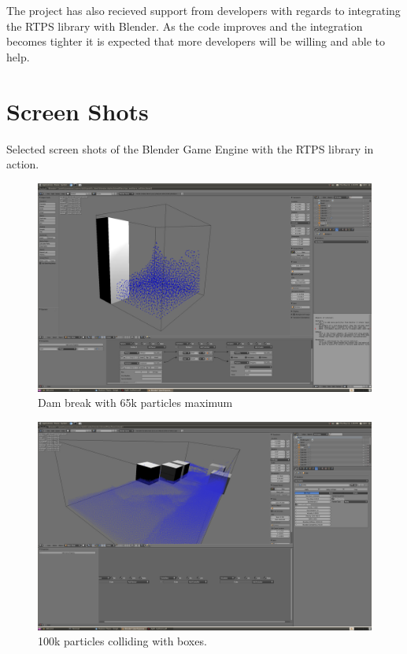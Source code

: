 The project has also recieved support from developers with regards to
integrating the RTPS library with Blender. As the code improves and the
integration becomes tighter it is expected that more developers will be willing
and able to help.


\section{Screen Shots}

Selected screen shots of the Blender Game Engine with the RTPS library in action.

\begin{figure}[!htc]
		\includegraphics[scale=0.17]{figures/dam_break.png}
        \caption{ Dam break with 65k particles maximum }
		\label{fig:dam_break}
\end{figure}

\pagebreak

\begin{figure}[!htc]
		\includegraphics[scale=0.17]{figures/flood1.png}
        \caption{ 100k particles colliding with boxes. }
		\label{fig:flood1}
\end{figure}

